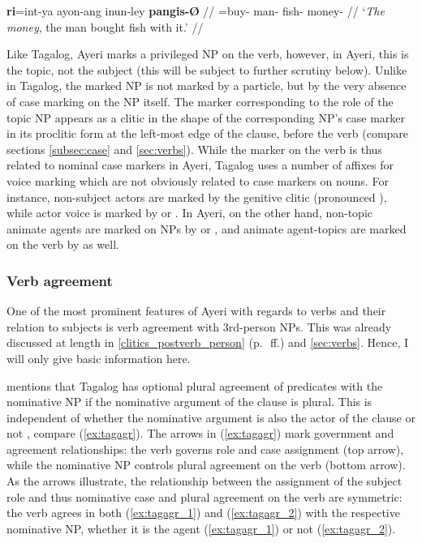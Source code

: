 \a\label{ex:ayrmarking_inst}\begingl
	\gla \textbf{ri}=int-ya ayon-ang inun-ley \textbf{pangis-Ø} //
	\glb \InsT{}=buy-\TsgM{} man-\Aarg{} fish-\PargI{} money-\Top{} //
	\glft `\emph{The money}, the man bought fish with it.' //
\endgl


\xe

Like Tagalog, Ayeri marks a privileged NP on the verb, however, in Ayeri, this
is the topic, not the subject (this will be subject to further scrutiny below).
Unlike in Tagalog, the marked NP is not marked by a particle, but by the very
absence of case marking on the NP itself. The marker corresponding to the role
of the topic NP appears as a clitic in the shape of the corresponding NP's case
marker in its proclitic form at the left-most edge of the clause, before the
verb (compare sections \ref{subsec:case} and \ref{sec:verbs}). While the marker
on the verb is thus related to nominal case markers in Ayeri, Tagalog uses a
number of affixes for voice marking which are not obviously related to case
markers on nouns. For instance, non-subject actors are marked by the genitive
clitic  (pronounced ), while actor voice is marked by 
or  \parencites[74, 78]{schachterotanes1972}[16--18]{kroeger1991}. In
Ayeri, on the other hand, non-topic animate agents are marked on NPs by
 or , and animate agent-topics are marked on
the verb by  as well.

\subsubsection{Verb agreement}
\label{subsubsec:verbagr}

One of the most prominent features of Ayeri with regards to verbs and their
relation to subjects is verb agreement with 3rd-person NPs. This was already
discussed at length in \autoref{clitics_postverb_person} 
(p.~\pageref{clitics_postverb_person}\,ff.) and \autoref{sec:verbs}. Hence, I
will only give basic information here.

\citet{kroeger1991} mentions that Tagalog has optional plural agreement of
predicates with the nominative NP if the nominative argument of the clause is
plural. This is independent of whether the nominative argument is also the
actor of the clause or not \citep[24--25]{kroeger1991}, compare
(\ref{ex:tagagr}). The arrows in (\ref{ex:tagagr}) mark government and
agreement relationships: the verb governs role and case assignment (top arrow),
while the nominative NP controls plural agreement on the verb (bottom arrow).
As the arrows illustrate, the relationship between the assignment of the
subject role and thus nominative case and plural agreement on the verb are
symmetric: the verb agrees in both (\ref{ex:tagagr_1}) and (\ref{ex:tagagr_2})
with the respective nominative NP, whether it is the agent (\ref{ex:tagagr_1})
or not (\ref{ex:tagagr_2}).

